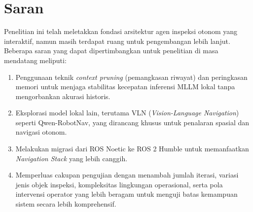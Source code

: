 \section{Saran}
Penelitian ini telah meletakkan fondasi arsitektur agen inspeksi otonom yang interaktif, namun masih terdapat ruang untuk pengembangan lebih lanjut. Beberapa saran yang dapat dipertimbangkan untuk penelitian di masa mendatang meliputi:

\begin{enumerate}
    \item Penggunaan teknik \textit{context pruning} (pemangkasan riwayat) dan peringkasan memori untuk menjaga stabilitas kecepatan inferensi MLLM lokal tanpa mengorbankan akurasi historis.
    
    \item Eksplorasi model lokal lain, terutama VLN (\textit{Vision-Language Navigation}) seperti Qwen-RobotNav, yang dirancang khusus untuk penalaran spasial dan navigasi otonom.
    
    \item Melakukan migrasi dari ROS Noetic ke ROS 2 Humble untuk memanfaatkan \textit{Navigation Stack} yang lebih canggih.
    
    \item Memperluas cakupan pengujian dengan menambah jumlah iterasi, variasi jenis objek inspeksi, kompleksitas lingkungan operasional, serta pola intervensi operator yang lebih beragam untuk menguji batas kemampuan sistem secara lebih komprehensif.
\end{enumerate}
